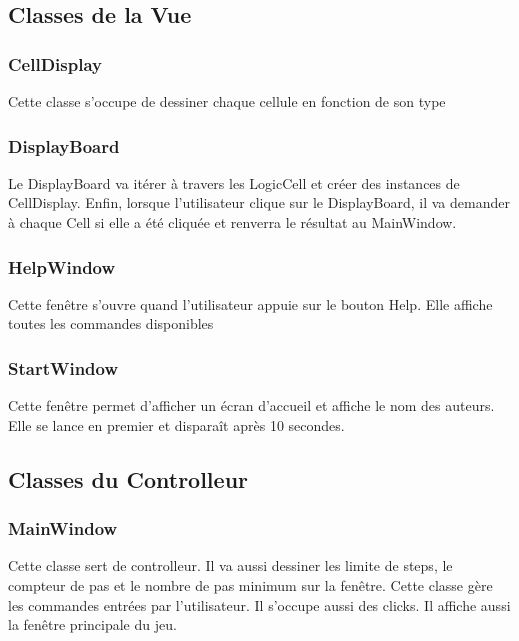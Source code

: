 \documentclass[utf8]{article}
\begin{document}
\begin{large}
\subsection{Classes de la Vue}
\subsubsection{CellDisplay}
\indent
\par
Cette classe s'occupe de dessiner chaque cellule en fonction de son type
\par
\subsubsection{DisplayBoard}
\indent
\par
Le DisplayBoard va itérer à travers les LogicCell et créer des instances de
CellDisplay. Enfin, lorsque l'utilisateur clique sur le
DisplayBoard, il va demander à chaque Cell si elle a été cliquée et renverra le
résultat au MainWindow.
\par
\subsubsection{HelpWindow}
\indent
\par
Cette fenêtre s'ouvre quand l'utilisateur appuie sur le bouton Help. Elle
affiche toutes les commandes disponibles
\par
\subsubsection{StartWindow}
\indent
\par
Cette fenêtre permet d'afficher un écran d'accueil et affiche le nom des
auteurs. Elle se lance en premier et disparaît après 10 secondes.
\par

\subsection{Classes du Controlleur}
\subsubsection{MainWindow}
\indent
\par
Cette classe sert de controlleur. Il va aussi dessiner les limite de steps, le
compteur de pas et le nombre de pas minimum sur la fenêtre. Cette classe
gère les commandes entrées par l'utilisateur. Il s'occupe aussi des clicks.
Il affiche aussi la fenêtre principale du jeu.
\par

\end{large}
\end{document}
